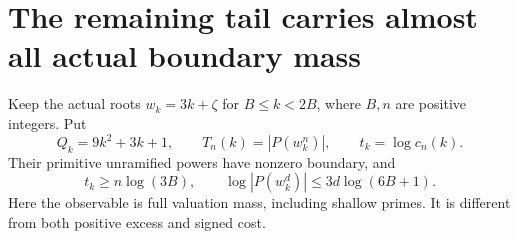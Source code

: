 \section{The remaining tail carries almost all actual boundary mass}
\label{fml-section}

Keep the actual roots $w_k=3k+\zeta$ for $B\le k<2B$, where
$B,n$ are positive integers. Put
\[
 Q_k=9k^2+3k+1,\qquad T_n(k)=|P(w_k^n)|,\qquad
 t_k=\log c_n(k).
\]
Their primitive unramified powers have nonzero boundary, and
\begin{equation}\label{fml-heights}
 t_k\ge n\log(3B),\qquad
 \log|P(w_k^d)|\le3d\log(6B+1).
\end{equation}
Here the observable is full valuation mass, including shallow primes.
It is different from both positive excess and signed cost.

